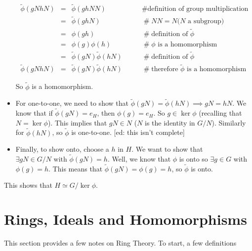 \documentclass[11pt, oneside]{article}   	%
\theoremstyle{definition}
\begin{document}
\begin{itemize}
\begin{equation*}
\begin{array}{rcll}
\widetilde{\phi}(gN hN)
&=& \widetilde{\phi}(ghNN)                                                              &\qquad \mathrel{\#} \text{definition of group multiplication}   \\
&=& \widetilde{\phi}(ghN)                                                                 &\qquad \mathrel{\#} NN = N \text{($N$ a subgroup)}  \\
&=& \phi(gh)                                                                                     &\qquad \mathrel{\#} \text{definition of $\widetilde{\phi}$}  \\
&=& \phi(g)\phi(h)                                                                               &\qquad \mathrel{\#} \phi \text{ is a homomorphism} \\
&=& \widetilde{\phi}(gN) \widetilde{\phi}(hN)                                      &\qquad \mathrel{\#} \text{definition of $\widetilde{\phi}$} \\
\widetilde{\phi}(gN hN) &=& \widetilde{\phi}(gN) \widetilde{\phi}(hN)   &\qquad \mathrel{\#} \text{therefore $\widetilde{\phi}$ is a homomorphism}
\end{array}
\end{equation*}

So $\widetilde{\phi}$ is a homomorphism.

\item  For one-to-one,  we need to show that $\widetilde{\phi}(gN) =  \widetilde{\phi}(hN)  \implies gN = hN$. We know that 
 if $\widetilde{\phi}(gN) = e_H$, then $\phi(g) = e_H$. So $g \in \ker \phi$ (recalling that $N = \ker \phi$). This implies that $gN \in N$ ($N$ is the 
identity in $G/N$). Similarly for $\widetilde{\phi}(hN)$, so $\widetilde{\phi}$ is one-to-one. [ed: this  isn't complete]

\item Finally,  to show onto,  choose a $h$ in $H$. We want to show that $\exists gN \in G/N \text{ with } \widetilde{\phi}(gN)  = h$. Well, we know that $\phi$ is onto
so $\exists g \in G$ with $\phi(g) = h$. This means that $\widetilde{\phi}(gN) = \phi(g) = h$, so $\widetilde{\phi}$ is onto.
\end{itemize}


\bigskip
\noindent
This shows that $H \simeq G/\ker \phi$.

\section{Rings, Ideals and Homomorphisms}
This section provides a few notes on Ring Theory. To start, a few definitions
\end{document}
